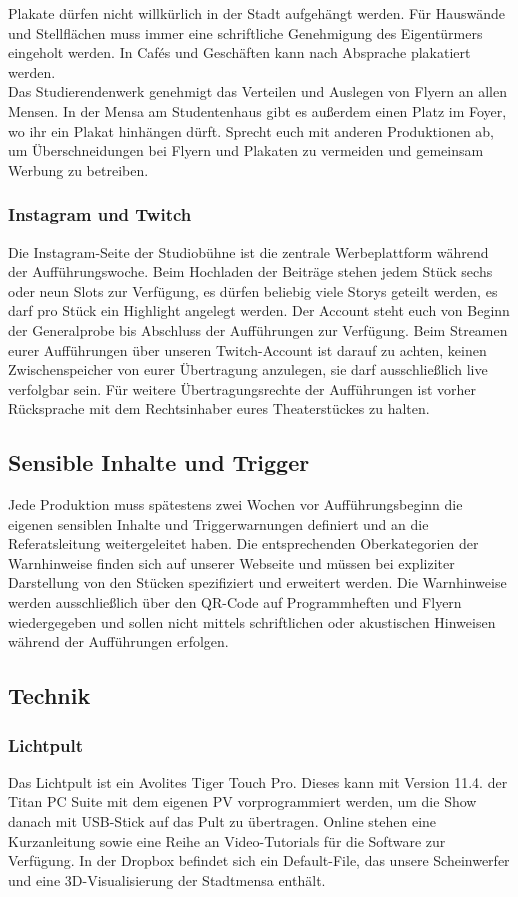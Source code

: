 Plakate dürfen nicht willkürlich in der Stadt aufgehängt werden. Für Hauswände und Stellflächen muss immer eine schriftliche Genehmigung des Eigentürmers eingeholt werden. In Cafés und Geschäften kann nach Absprache plakatiert werden.	\\

Das Studierendenwerk genehmigt das Verteilen und Auslegen von Flyern an allen Mensen. In der Mensa am Studentenhaus gibt es außerdem einen Platz im Foyer, wo ihr ein Plakat hinhängen dürft. 
Sprecht euch mit anderen Produktionen ab, um Überschneidungen bei Flyern und Plakaten zu vermeiden und gemeinsam Werbung zu betreiben.

\subsubsection{Instagram und Twitch}
Die Instagram-Seite der Studiobühne ist die zentrale Werbeplattform während der Aufführungswoche. Beim Hochladen der Beiträge stehen jedem Stück sechs oder neun Slots zur Verfügung, es dürfen beliebig viele Storys geteilt werden, es darf pro Stück ein Highlight angelegt werden. Der Account steht euch von Beginn der Generalprobe bis Abschluss der Aufführungen zur Verfügung.
Beim Streamen eurer Aufführungen über unseren Twitch-Account ist darauf zu achten, keinen Zwischenspeicher von eurer Übertragung anzulegen, sie darf ausschließlich live verfolgbar sein. Für weitere Übertragungsrechte der Aufführungen ist vorher Rücksprache mit dem Rechtsinhaber eures Theaterstückes zu halten.	

\subsection{Sensible Inhalte und Trigger}
Jede Produktion muss spätestens zwei Wochen vor Aufführungsbeginn die eigenen sensiblen Inhalte und Triggerwarnungen definiert und an die Referatsleitung weitergeleitet haben.	
Die entsprechenden Oberkategorien der Warnhinweise finden sich auf unserer Webseite und müssen bei expliziter Darstellung von den Stücken spezifiziert und erweitert werden.
Die Warnhinweise werden ausschließlich über den QR-Code auf Programmheften und Flyern wiedergegeben und sollen nicht mittels schriftlichen oder akustischen Hinweisen während der Aufführungen erfolgen.

\subsection{Technik}
\subsubsection{Lichtpult}
Das Lichtpult ist ein Avolites Tiger Touch Pro. Dieses kann mit Version 11.4. der Titan PC Suite mit dem eigenen PV vorprogrammiert werden, um die Show danach mit USB-Stick auf das Pult zu übertragen. Online stehen eine Kurzanleitung sowie eine Reihe an Video-Tutorials für die Software zur Verfügung.	
In der Dropbox befindet sich ein Default-File, das unsere Scheinwerfer und eine 3D-Visualisierung der Stadtmensa enthält.

